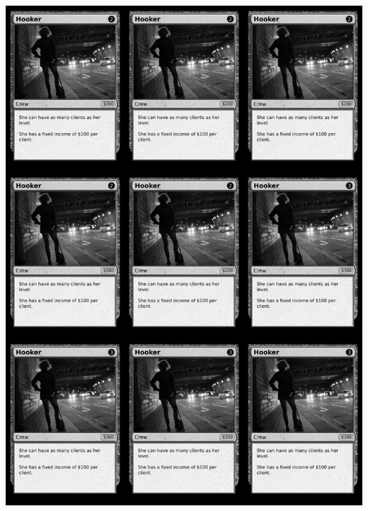 \documentclass[a4paper]{article}
\begin{document}
\begin{center}
	\centering
	\includegraphics[width=190.5mm,height=266.7mm]{output/temp/page15.png}
\end{center}

\newpage
\end{document}
